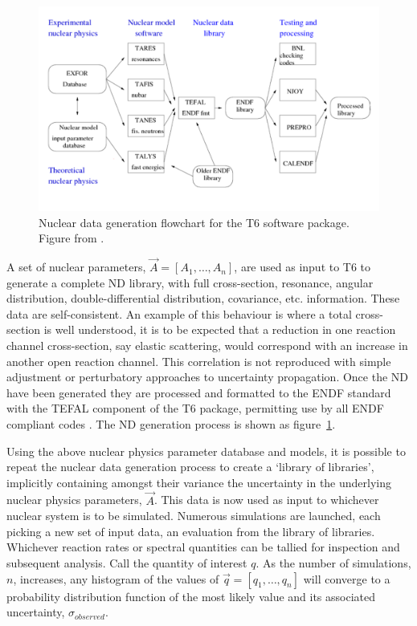 \begin{figure}
  \centering
  \includegraphics[width=\textwidth]{t6_flow.png}
  \caption{Nuclear data generation flowchart for the T6 software package. Figure from \cite{Koning2013}.}
  \label{fig:t6_overview}
\end{figure}

A set of nuclear parameters, $\vec{A} = [A_{1},\ldots,A_{n}]$, are used as input to T6 to generate a complete ND library, with full cross-section, resonance, angular distribution, double-differential distribution, covariance, etc. information. These data are self-consistent. An example of this behaviour is where a total cross-section is well understood, it is to be expected that a reduction in one reaction channel cross-section, say elastic scattering, would correspond with an increase in another open reaction channel. This correlation is not reproduced with simple adjustment or perturbatory approaches to uncertainty propagation. Once the ND have been generated they are processed and formatted to the ENDF standard with the TEFAL component of the T6 package, permitting use by all ENDF compliant codes \cite{Koning2012}. The ND generation process is shown as figure~\ref{fig:t6_overview}.

Using the above nuclear physics parameter database and models, it is possible to repeat the nuclear data generation process to create a `library of libraries', implicitly containing amongst their variance the uncertainty in the underlying nuclear physics parameters, $\vec{A}$. This data is now used as input to whichever nuclear system is to be simulated. Numerous simulations are launched, each picking a new set of input data, an evaluation from the library of libraries. Whichever reaction rates or spectral quantities can be tallied for inspection and subsequent analysis. Call the quantity of interest $q$. As the number of simulations, $n$, increases, any histogram of the values of $\vec{q} = [q_{1},\ldots,q_{n}]$ will converge to a probability distribution function of the most likely value and its associated uncertainty, $\sigma_{observed}$. 


